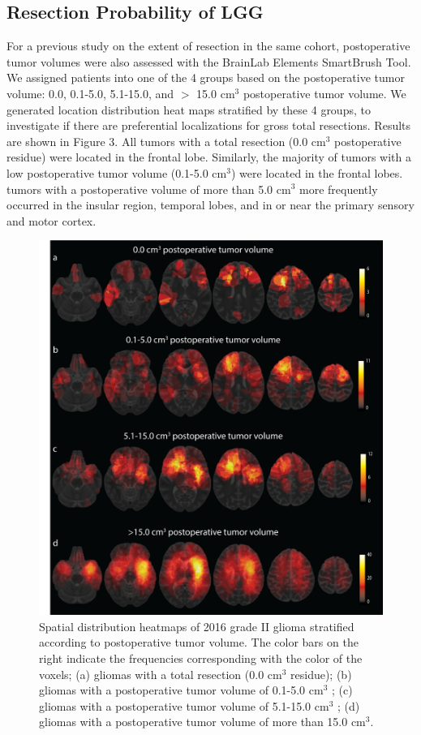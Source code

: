 \subsection{Resection Probability of LGG}
For a previous study on the extent of resection in the same cohort, postoperative \gls{tumor} volumes were also assessed with the BrainLab Elements SmartBrush Tool.
We assigned patients into one of the 4 groups based on the postoperative \gls{tumor} volume: 0.0, 0.1-5.0, 5.1-15.0, and $>$ 15.0 cm$^3$ postoperative \gls{tumor} volume.
We generated location distribution heat maps stratified by these 4 groups, to investigate if there are preferential localizations for gross total resections.
Results are shown in Figure 3.
All \glspl{tumor} with a total resection (0.0 cm$^3$ postoperative residue) were located in the frontal lobe.
Similarly, the majority of \glspl{tumor} with a low postoperative \gls{tumor} volume (0.1-5.0 cm$^3$) were located in the frontal lobes.
\Glspl{tumor} with a postoperative volume of more than 5.0 cm$^3$ more frequently occurred in the insular region, temporal lobes, and in or near the primary sensory and motor cortex.

\begin{figure}[htbp]
\centering
\includegraphics[width=\textwidth]{Figures/Figure_3.png}
\caption{Spatial distribution heatmaps of  2016 grade II glioma stratified according to postoperative \gls{tumor} volume. The color bars on the right
indicate the frequencies corresponding with the color of the voxels; (a) gliomas with a total resection (0.0 cm$^3$ residue); (b) gliomas with a postoperative \gls{tumor} volume of 0.1-5.0 cm$^3$ ; (c) gliomas with a postoperative \gls{tumor} volume of 5.1-15.0 cm$^3$ ; (d) gliomas with a postoperative \gls{tumor} volume
of more than 15.0 cm$^3$.}
\label{fig:LGG_location_postop_volume}
\end{figure}



